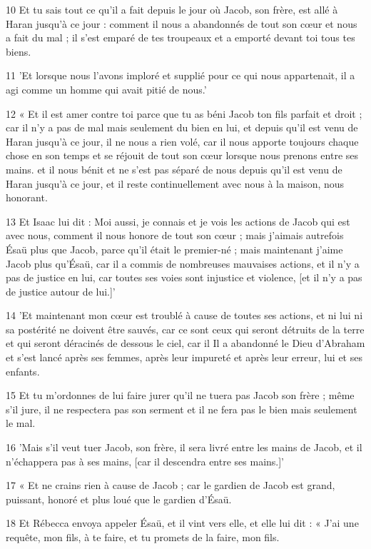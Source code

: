 \par 10 Et tu sais tout ce qu'il a fait depuis le jour où Jacob, son frère, est allé à Haran jusqu'à ce jour : comment il nous a abandonnés de tout son cœur et nous a fait du mal ; il s'est emparé de tes troupeaux et a emporté devant toi tous tes biens.
\par 11 'Et lorsque nous l'avons imploré et supplié pour ce qui nous appartenait, il a agi comme un homme qui avait pitié de nous.'
\par 12 « Et il est amer contre toi parce que tu as béni Jacob ton fils parfait et droit ; car il n'y a pas de mal mais seulement du bien en lui, et depuis qu'il est venu de Haran jusqu'à ce jour, il ne nous a rien volé, car il nous apporte toujours chaque chose en son temps et se réjouit de tout son cœur lorsque nous prenons entre ses mains. et il nous bénit et ne s'est pas séparé de nous depuis qu'il est venu de Haran jusqu'à ce jour, et il reste continuellement avec nous à la maison, nous honorant.
\par 13 Et Isaac lui dit : Moi aussi, je connais et je vois les actions de Jacob qui est avec nous, comment il nous honore de tout son cœur ; mais j'aimais autrefois Ésaü plus que Jacob, parce qu'il était le premier-né ; mais maintenant j'aime Jacob plus qu'Ésaü, car il a commis de nombreuses mauvaises actions, et il n'y a pas de justice en lui, car toutes ses voies sont injustice et violence, [et il n'y a pas de justice autour de lui.]'
\par 14 'Et maintenant mon cœur est troublé à cause de toutes ses actions, et ni lui ni sa postérité ne doivent être sauvés, car ce sont ceux qui seront détruits de la terre et qui seront déracinés de dessous le ciel, car il Il a abandonné le Dieu d'Abraham et s'est lancé après ses femmes, après leur impureté et après leur erreur, lui et ses enfants.
\par 15 Et tu m'ordonnes de lui faire jurer qu'il ne tuera pas Jacob son frère ; même s'il jure, il ne respectera pas son serment et il ne fera pas le bien mais seulement le mal.
\par 16 'Mais s'il veut tuer Jacob, son frère, il sera livré entre les mains de Jacob, et il n'échappera pas à ses mains, [car il descendra entre ses mains.]'
\par 17 « Et ne crains rien à cause de Jacob ; car le gardien de Jacob est grand, puissant, honoré et plus loué que le gardien d'Ésaü.
\par 18 Et Rébecca envoya appeler Ésaü, et il vint vers elle, et elle lui dit : « J'ai une requête, mon fils, à te faire, et tu promets de la faire, mon fils.
